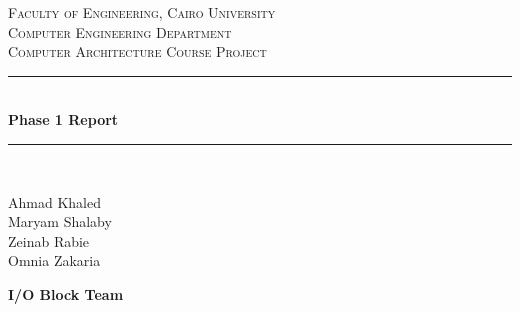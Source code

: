 \documentclass[12pt]{article}
\theoremstyle{plain}
\theoremstyle{definition}
\begin{document}
	
	
\begin{titlepage}

	\newcommand{\HRule}{\rule{\linewidth}{0.5mm}} %
	
	\center %
	 
	
	\textsc{\LARGE Faculty of Engineering, Cairo University}\\[0.5cm] %
	\textsc{\large Computer Engineering Department}\\[1.5cm] %
	
	\textsc{\Large Computer Architecture Course Project}\\[0.5cm] %
	
	
	\HRule \\[0.4cm]
	{ \huge \bfseries Phase 1 Report}\\[0.4cm] %
	\HRule \\[1.5cm]
	 
	
	\begin{minipage}{0.4\textwidth}
	\begin{flushleft} \large
	Ahmad Khaled \\
	Maryam Shalaby \\
	Zeinab Rabie \\
	Omnia Zakaria
	\end{flushleft}
	\end{minipage}
	\begin{minipage}{0.4\textwidth}
	\begin{flushright} \large
	\textbf{I/O Block Team} \\[4cm]
	\end{flushright}
	\end{minipage}\\[1cm]
	

\end{titlepage}
\end{document}
